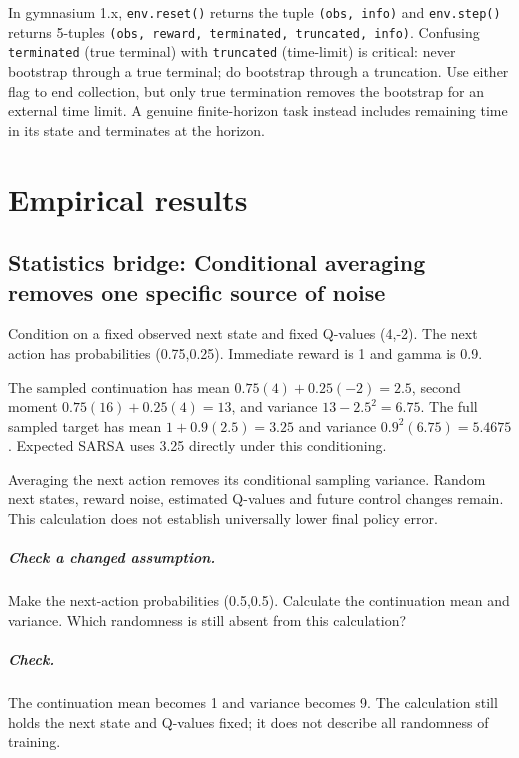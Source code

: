 \documentclass[11pt,oneside]{scrbook}
\begin{document}
\begin{pitfall}
In gymnasium 1.x, \texttt{env.reset()} returns the tuple \texttt{(obs, info)} and
\texttt{env.step()} returns 5-tuples \texttt{(obs, reward, terminated, truncated, info)}.
Confusing \texttt{terminated} (true terminal) with \texttt{truncated} (time-limit) is
critical: never bootstrap through a true terminal; do bootstrap through a truncation.
Use either flag to end collection, but only true termination removes the
bootstrap for an external time limit. A genuine finite-horizon task instead
includes remaining time in its state and terminates at the horizon.
\end{pitfall}

\chapter{Empirical results}

\section{Statistics bridge: Conditional averaging removes one specific source of noise}
\begin{example}
Condition on a fixed observed next state and fixed Q-values (4,-2). The next action has probabilities (0.75,0.25). Immediate reward is 1 and gamma is 0.9.

The sampled continuation has mean $0.75(4)+0.25(-2)=2.5$, second moment $0.75(16)+0.25(4)=13$, and variance $13-2.5^2=6.75$. The full sampled target has mean $1+0.9(2.5)=3.25$ and variance $0.9^2(6.75)=5.4675$. Expected SARSA uses 3.25 directly under this conditioning.
\end{example}
Averaging the next action removes its conditional sampling variance. Random next states, reward noise, estimated Q-values and future control changes remain. This calculation does not establish universally lower final policy error.

\paragraph{Check a changed assumption.} Make the next-action probabilities (0.5,0.5). Calculate the continuation mean and variance. Which randomness is still absent from this calculation?
\paragraph{Check.} The continuation mean becomes 1 and variance becomes 9. The calculation still holds the next state and Q-values fixed; it does not describe all randomness of training.
\end{document}
